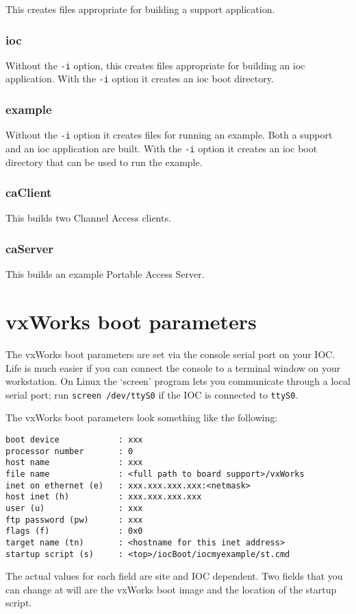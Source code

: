 This creates files appropriate for building a support application.

\subsubsection{ioc}

Without the \verb|-i| option, this creates files appropriate for building an ioc application.
With the \verb|-i| option it creates an ioc boot directory.

\subsubsection{example}

Without the \verb|-i| option it creates files for running an example.
Both a support and an ioc application are built.
With the \verb|-i| option it creates an ioc boot directory that can be used to run the example.

\subsubsection{caClient}

This builds two Channel Access clients.

\subsubsection{caServer}

This builds an example Portable Access Server.

\section{vxWorks boot parameters}

The vxWorks boot parameters are set via the console serial port on your IOC.
Life is much easier if you can connect the console to a terminal window on your workstation.
On Linux the `screen' program lets you communicate through a local serial port; run \verb|screen /dev/ttyS0| if the IOC is connected to \verb|ttyS0|.

The vxWorks boot parameters look something like the following:

\begin{verbatim}
boot device            : xxx
processor number       : 0
host name              : xxx
file name              : <full path to board support>/vxWorks
inet on ethernet (e)   : xxx.xxx.xxx.xxx:<netmask>
host inet (h)          : xxx.xxx.xxx.xxx
user (u)               : xxx
ftp password (pw)      : xxx
flags (f)              : 0x0
target name (tn)       : <hostname for this inet address>
startup script (s)     : <top>/iocBoot/iocmyexample/st.cmd
\end{verbatim}
The actual values for each field are site and IOC dependent.
Two fields that you can change at will are the vxWorks boot image and the location of the startup script.

